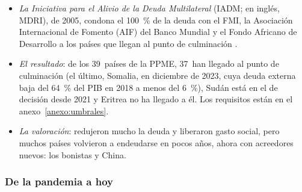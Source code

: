 \documentclass[11pt]{article}
\begin{document}
\begin{itemize}
\item \emph{La Iniciativa para el Alivio de la Deuda Multilateral} (IADM; en inglés, MDRI), de 2005, condona el 100~\% de la deuda con el FMI, la Asociación Internacional de Fomento (AIF) del Banco Mundial y el Fondo Africano de Desarrollo a los países que llegan al punto de culminación\nocite{FMI2023HIPC} .
\item \emph{El resultado}: de los 39~países de la PPME, 37~han llegado al punto de culminación (el último, Somalia, en diciembre de 2023, cuya deuda externa baja del 64~\% del PIB en 2018 a menos del 6~\%), Sudán está en el de decisión desde 2021 y Eritrea no ha llegado a él\nocite{FMI2023HIPC,FMI2023Somalia}. Los requisitos están en el anexo~\ref{anexo:umbrales}.
\item \emph{La valoración}: redujeron mucho la deuda y liberaron gasto social, pero muchos países volvieron a endeudarse en pocos años, ahora con acreedores nuevos: los bonistas y China.
\end{itemize}

\subsubsection{De la pandemia a hoy}\label{sec:deuda-hoy}
\end{document}
